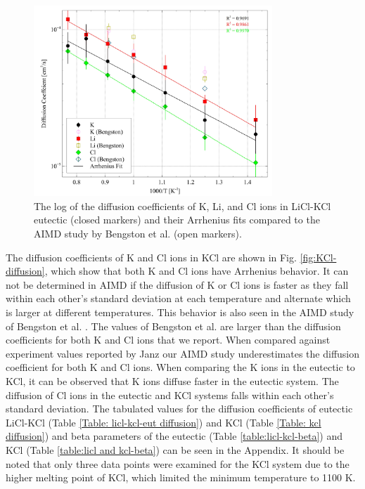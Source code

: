 \documentclass[review]{elsarticle}
\begin{document}
\begin{figure}[h!]
 \centering
 \includegraphics[width=0.8\textwidth]{diff_eutectic_licl_kcl.jpg} 
 \caption{The log of the diffusion coefficients of K, Li, and Cl ions in LiCl-KCl eutectic (closed markers) and their Arrhenius fits compared to the AIMD study by Bengston et al. \cite{Bengston2014} (open markers).}
 \label{fig:LiCl-KCl-diffusion}
\end{figure} 

The diffusion coefficients of K and Cl ions in KCl are shown in Fig. \ref{fig:KCl-diffusion}, which show that both K and Cl ions have Arrhenius behavior. It can not be determined in AIMD if the diffusion of K or Cl ions is faster as they fall within each other's standard deviation at each temperature and alternate which is larger at different temperatures. This behavior is also seen in the AIMD study of Bengston et al. \cite{Bengston2014}. The values of Bengston et al. are larger than the diffusion coefficients for both K and Cl ions that we report. When compared against experiment values reported by Janz \cite{janz_Diffusion} our AIMD study underestimates the diffusion coefficient for both K and Cl ions. When comparing the K ions in the eutectic to KCl, it can be observed that K ions diffuse faster in the eutectic system. The diffusion of Cl ions in the eutectic and KCl systems falls within each other's standard deviation. The tabulated values for the diffusion coefficients of eutectic LiCl-KCl (Table \ref{Table: licl-kcl-eut diffusion}) and KCl (Table \ref{Table: kcl diffusion}) and beta parameters of the eutectic (Table \ref{table:licl-kcl-beta}) and KCl (Table \ref{table:licl and kcl-beta}) can be seen in the Appendix. It should be noted that only three data points were examined for the KCl system due to the higher melting point of KCl, which limited the minimum temperature to 1100 K. 
\end{document}
